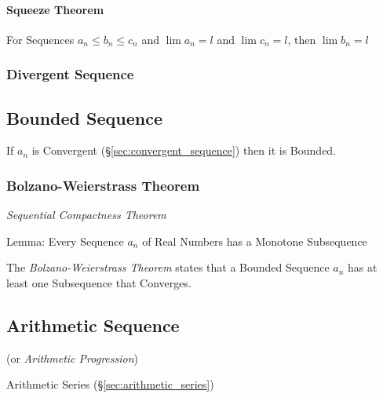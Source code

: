 \paragraph{Squeeze Theorem}\label{sec:squeeze_theorem}\hfill

For Sequences $a_n \leq b_n \leq c_n$ and $\lim a_n = l$ and $\lim c_n
= l$, then $\lim b_n = l$



\subsubsection{Divergent Sequence}\label{sec:divergent_sequence}



\subsection{Bounded Sequence}\label{sec:bounded_sequence}

If $a_n$ is Convergent (\S\ref{sec:convergent_sequence}) then it is
Bounded.



\subsubsection{Bolzano-Weierstrass Theorem}
\label{sec:bolzano_weierstrass}

\emph{Sequential Compactness Theorem}

Lemma: Every Sequence $a_n$ of Real Numbers has a Monotone
Subsequence

The \emph{Bolzano-Weierstrass Theorem} states that a Bounded Sequence
$a_n$ has at least one Subsequence that Converges.



\subsection{Arithmetic Sequence}\label{sec:arithmetic_sequence}

(or \emph{Arithmetic Progression})

Arithmetic Series (\S\ref{sec:arithmetic_series})



